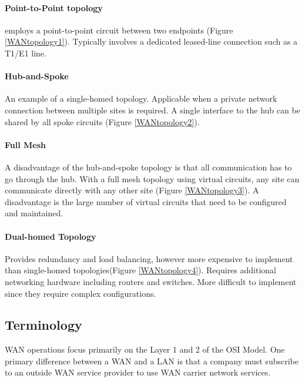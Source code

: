 \paragraph{Point-to-Point topology} employs a point-to-point circuit between two endpoints (Figure \ref{WANtopology1}). Typically involves a dedicated leased-line connection such as a T1/E1 line.

\paragraph{Hub-and-Spoke} An example of a single-homed topology. Applicable when a private network connection between multiple sites is required. A single interface to the hub can be shared by all spoke circuits (Figure \ref{WANtopology2}).

\paragraph{Full Mesh} A disadvantage of the hub-and-spoke topology is that all communication has to go through the hub. With a full mesh topology using virtual circuits, any site can communicate directly with any other site (Figure \ref{WANtopology3}). A disadvantage is the large number of virtual circuits that need to be configured and maintained.

\paragraph{Dual-homed Topology} Provides redundancy and load balancing, however more expensive to implement than single-homed topologies(Figure \ref{WANtopology4}). Requires additional networking hardware including routers and switches. More difficult to implement since they require complex configurations.

\subsection{Terminology}

WAN operations focus primarily on the Layer 1 and 2 of the OSI Model. One primary difference between a WAN and a LAN is that a company must subscribe to an outside WAN service provider to use WAN carrier network services.\\

